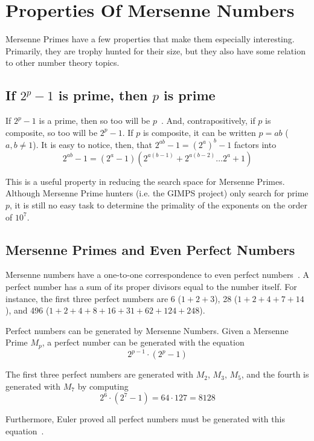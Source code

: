 \section{Properties Of Mersenne Numbers}

Mersenne Primes have a few properties that make them especially interesting. Primarily, they
are trophy hunted for their size, but they also have some relation to other number theory topics.

\subsection{If $2^p-1$ is prime, then $p$ is prime}

If $2^p-1$ is a prime, then so too will be $p$~\cite{LighNeal}. And, contrapositively, if $p$ is composite,
so too will be $2^p-1$. If $p$ is composite, it can be written $p = ab$ ($a,b \ne 1$). It is easy to notice, then,
that $2^{ab} - 1 = (2^a)^b - 1$ factors into 
\begin{equation*}
    2^{ab} - 1 = (2^a-1)(2^{a(b-1)} + 2^{a(b-2)} \ldots 2^{a} + 1)
\end{equation*}

This is a useful property in reducing the search space for Mersenne Primes. Although Mersenne Prime hunters
(i.e. the GIMPS project) only search for prime $p$, it is still no easy task to determine the primality
of the exponents on the order of $10^{7}$.

\subsection{Mersenne Primes and Even Perfect Numbers}

Mersenne numbers have a one-to-one correspondence to even perfect numbers~\cite{perfect}. A perfect number has
a sum of its proper divisors equal to the number itself. For instance, the first three perfect numbers
are 6 ($1 + 2 + 3$), 28 ($1 + 2 + 4 + 7 + 14$), and 496 ($1 + 2 + 4 + 8 + 16 + 31 + 62 + 124 + 248$).

Perfect numbers can be generated by Mersenne Numbers. Given a Mersenne Prime $M_p$, a perfect number can be
generated with the equation
\begin{equation}
\label{eqn:perfno}
2^{p-1}\cdot(2^p-1)
\end{equation}

The first three perfect numbers are generated with $M_2$, $M_3$, $M_5$, and the fourth is generated with $M_7$ by computing 
\[ 2^6\cdot(2^7-1) = 64\cdot127 = 8128 \]

Furthermore, Euler proved all perfect numbers must be generated with this equation~\cite{perfect}.
